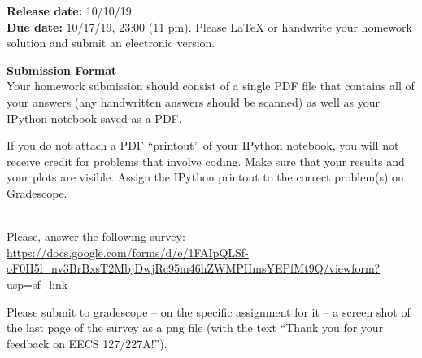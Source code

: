 

\def\title{Homework 6}

\newcommand{\qitem}{\qpart\item}

\renewcommand{\labelenumi}{(\alph{enumi})} %
\renewcommand{\theenumi}{(\alph{enumi})} %
\renewcommand{\labelenumii}{\roman{enumii}.} %
\renewcommand{\theenumii}{\roman{enumii}.}

\maketitle






\noindent
{\bf Release date:} 10/10/19.\\
{\bf Due date:}  10/17/19, 23:00 (11 pm). Please \LaTeX{} or handwrite your homework solution and submit an electronic version. 

\textbf{Submission Format} \\
Your homework submission should consist of a single PDF file that contains all of your answers (any handwritten answers should be scanned) as well as your IPython notebook saved as a PDF.
			
If you do not attach a PDF ``printout'' of your IPython notebook, you will not receive credit for problems that involve coding. Make sure that your results and your plots are visible. Assign the IPython printout to the correct problem(s) on Gradescope.

\begin{qunlist}

\newpage

\newpage

\newpage

\newpage
{}\\
Please, answer the following survey: \url{https://docs.google.com/forms/d/e/1FAIpQLSf-oF0H5l_nv3BrBxsT2MbjDwjRc95m46hZWMPHmsYEPfMt9Q/viewform?usp=sf_link}

Please submit to gradescope -- on the specific assignment for it -- a screen shot of the last page of the survey as a png file (with the text ``Thank you for your feedback on EECS 127/227A!'').

\end{qunlist}

